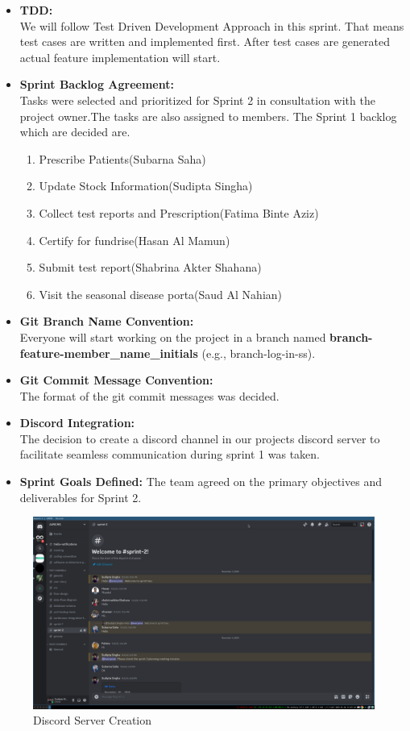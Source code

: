 \documentclass[a4paper,12pt]{article}
\begin{document}
\begin{itemize}
    \item \textbf{TDD:}\\We will follow Test Driven Development Approach in this sprint. That means test cases
        are written and implemented first. After test cases are generated actual feature implementation will
        start.
    \item \textbf{Sprint Backlog Agreement:}\\Tasks were selected and prioritized for Sprint 2 in consultation
        with the project owner.The tasks are also assigned to members. The Sprint 1 backlog which are decided are.
        \begin{enumerate}
            \item Prescribe Patients(Subarna Saha)
            \item Update Stock Information(Sudipta Singha)
            \item Collect test reports and Prescription(Fatima Binte Aziz)
            \item Certify for fundrise(Hasan Al Mamun)
            \item Submit test report(Shabrina Akter Shahana)
            \item Visit the seasonal disease porta(Saud Al Nahian)
        \end{enumerate}
        \item \textbf{Git Branch Name Convention: }\\Everyone will start working on the project in a branch named
        \textbf{branch-feature-member\_name\_initials} (e.g., branch-log-in-ss).
    \item \textbf{Git Commit Message Convention: }\\The format of the git commit messages was decided.
    \item \textbf{Discord Integration: } \\The decision to create a discord channel in our projects discord server to
        facilitate seamless communication during sprint 1 was taken.
    \item \textbf{Sprint Goals Defined: }The team agreed on the primary objectives and deliverables for Sprint
        2.
\end{itemize}
\newpage
\begin{figure}[H]
    \centering
    \includegraphics[width=1\textwidth]{images/spr2plan1.png}   
    \caption{Discord Server Creation}
    \label{fig:spr2plan1}
\end{figure}
\end{document}

